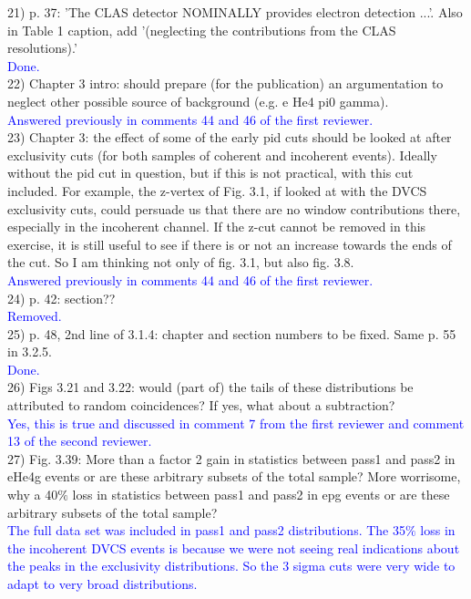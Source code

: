 21) p. 37: 'The CLAS detector NOMINALLY provides electron detection ...'. Also 
in Table 1 caption, add '(neglecting the contributions from the CLAS 
resolutions).'\\
\textcolor{blue}{  Done.}\\

22) Chapter 3 intro: should prepare (for the publication) an argumentation to 
neglect other possible source of background (e.g. e He4 pi0 gamma). \\
\textcolor{blue}{ Answered previously in comments 44 and 46 of the first 
reviewer.}\\

23) Chapter 3: the effect of some of the early pid cuts should be looked at after 
exclusivity cuts (for both samples of coherent and incoherent events). Ideally 
without the pid cut in question, but if this is not practical, with this cut 
included. For example, the z-vertex of Fig. 3.1, if looked at with the DVCS 
exclusivity cuts, could persuade us that there are no window contributions 
there, especially in the incoherent channel. If the z-cut cannot be removed in 
this exercise, it is still useful to see if there is or not an increase towards 
the ends of the cut. So I am thinking not only of fig. 3.1, but also fig. 3.8. \\
\textcolor{blue}{ Answered previously in comments 44 and 46 of the first 
reviewer.}\\

24) p. 42: section?? \\
\textcolor{blue}{ Removed.}\\
 
25) p. 48, 2nd line of 3.1.4: chapter and section numbers to be fixed. Same p. 55 
in 3.2.5. \\
\textcolor{blue}{Done.}\\

26) Figs 3.21 and 3.22: would (part of) the tails of these distributions be 
attributed to random coincidences? If yes, what about a subtraction? \\
\textcolor{blue}{Yes, this is true and discussed in 
comment 7 from the first reviewer and comment 13 of the second reviewer.}\\

27) Fig. 3.39: More than a factor 2 gain in statistics between pass1 and pass2 in 
eHe4g events or are these arbitrary subsets of the total sample? More 
worrisome, why a 40$\%$ loss in statistics between pass1 and pass2 in epg 
events or are these arbitrary subsets of the total sample?\\
\textcolor{blue}{
The full data set was included in pass1 and pass2 distributions. The 35$\%$ 
loss in the incoherent DVCS events is because we were not seeing real 
indications about the peaks in the exclusivity distributions. So the 3 sigma 
cuts were very wide to adapt to very broad distributions. }\\

